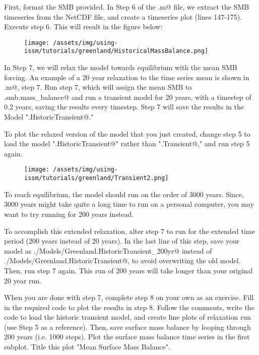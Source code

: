 First, format the SMB provided. In Step 6 of the \verb@runme.m@ file, we extract the SMB timeseries from the NetCDF file, and create a timeseries plot (lines 147-175). Execute step 6. This will result in the figure below:
\begin{figure}[H]
	\begin{center}
		\texttt{[image: /assets/img/using-issm/tutorials/greenland/HistoricalMassBalance.png]}
	\end{center}
\end{figure}

In Step 7, we will relax the model towards equilibrium with the mean SMB forcing. An example of a 20 year relaxation to the time series mean is shown in \verb@runme.m@, step 7. Run step 7, which will assign the mean SMB to \verb@md.smb.mass_balance@ and run a transient model for 20 years, with a timestep of 0.2 years, saving the results every timestep. Step 7 will save the results in the Model "\verb@Greenland.HistoricTransient@."

To plot the relaxed version of the model that you just created, change step 5 to load the model "\verb@Greenland.HistoricTransient@" rather than "\verb@Greenland.Transient@," and run step 5 again.

\begin{figure}[H]
	\begin{center}
		\texttt{[image: /assets/img/using-issm/tutorials/greenland/Transient2.png]}
	\end{center}
\end{figure}

To reach equilibrium, the model should run on the order of 3000 years. Since, 3000 years might take quite a long time to run on a personal computer, you may want to try running for 200 years instead.

To accomplish this extended relaxation, alter step 7 to run for the extended time period (200 years instead of 20 years). In the last line of this step, save your model as \verb@./Models/Greenland.HistoricTransient_200yr@ instead of \verb@./Models/Greenland.HistoricTransient@, to avoid overwriting the old model. Then, run step 7 again. This run of 200 years will take longer than your original 20 year run.

When you are done with step 7, complete step 8 on your own as an exercise. Fill in the required code to plot the results in step 8. Follow the comments, write the code to load the historic transient model, and create line plots of relaxation run (use Step 5 as a reference). Then, save surface mass balance by looping through 200 years (i.e. 1000 steps). Plot the surface mass balance time series in the first subplot. Title this plot "Mean Surface Mass Balance".

